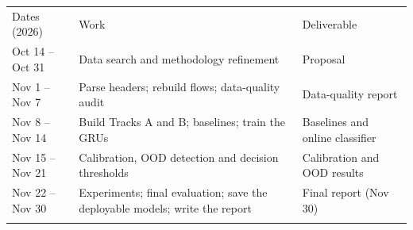 \documentclass[11pt]{article}
\makeatletter
\newcommand{\toprule}{\noalign{\hrule height 0.8pt\vskip 3pt}}
\newcommand{\midrule}{\noalign{\vskip 2pt\hrule height 0.4pt\vskip 3pt}}
\newcommand{\bottomrule}{\noalign{\vskip 2pt\hrule height 0.8pt}}
\newenvironment{ptable}{\par\medskip\noindent\begin{minipage}{\linewidth}\centering\def\@captype{table}}{\end{minipage}\par\medskip}
\makeatother
\begin{document}
\begin{ptable}
\small
\begin{tabularx}{\linewidth}{@{}p{3.2cm}X>{\raggedright\arraybackslash}p{3.6cm}@{}}
\toprule
Dates (2026) & Work & Deliverable \\
\midrule
Oct 14 -- Oct 31 & Data search and methodology refinement & Proposal \\
Nov 1 -- Nov 7 & Parse headers; rebuild flows; data-quality audit & Data-quality report \\
Nov 8 -- Nov 14 & Build Tracks A and B; baselines; train the GRUs & Baselines and online classifier \\
Nov 15 -- Nov 21 & Calibration, OOD detection and decision thresholds & Calibration and OOD results \\
Nov 22 -- Nov 30 & Experiments; final evaluation; save the deployable models; write the report & Final report (Nov 30) \\
\bottomrule
\end{tabularx}
\end{ptable}
\end{document}
